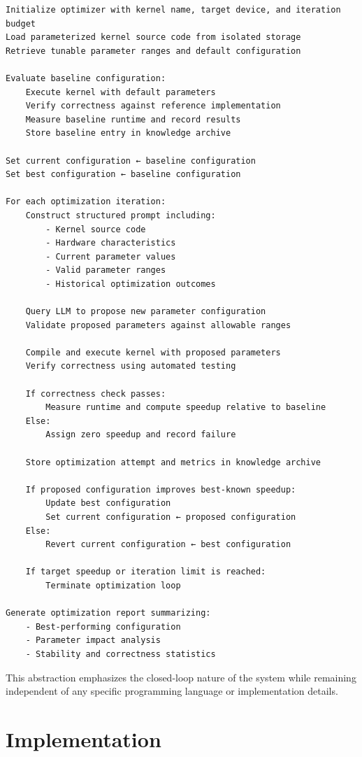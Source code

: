 \documentclass{article}
\begin{document}
\begin{Verbatim}[formatcom=\color{mycodecolor}]
Initialize optimizer with kernel name, target device, and iteration budget
Load parameterized kernel source code from isolated storage
Retrieve tunable parameter ranges and default configuration

Evaluate baseline configuration:
    Execute kernel with default parameters
    Verify correctness against reference implementation
    Measure baseline runtime and record results
    Store baseline entry in knowledge archive

Set current configuration ← baseline configuration
Set best configuration ← baseline configuration

For each optimization iteration:
    Construct structured prompt including:
        - Kernel source code
        - Hardware characteristics
        - Current parameter values
        - Valid parameter ranges
        - Historical optimization outcomes

    Query LLM to propose new parameter configuration
    Validate proposed parameters against allowable ranges

    Compile and execute kernel with proposed parameters
    Verify correctness using automated testing

    If correctness check passes:
        Measure runtime and compute speedup relative to baseline
    Else:
        Assign zero speedup and record failure

    Store optimization attempt and metrics in knowledge archive

    If proposed configuration improves best-known speedup:
        Update best configuration
        Set current configuration ← proposed configuration
    Else:
        Revert current configuration ← best configuration

    If target speedup or iteration limit is reached:
        Terminate optimization loop

Generate optimization report summarizing:
    - Best-performing configuration
    - Parameter impact analysis
    - Stability and correctness statistics
\end{Verbatim}

This abstraction emphasizes the closed-loop nature of the system while remaining independent of any specific programming language or implementation details.

\section {Implementation}
\end{document}
